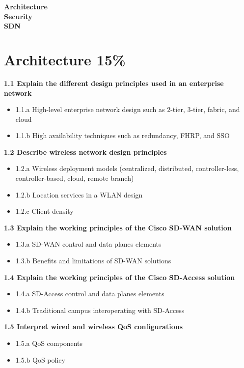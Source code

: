 \documentclass{article}
\begin{document}
\newpage
\noindent\textbf{Architecture}\\

\newpage
\noindent\textbf{Security}\\

\newpage
\noindent\textbf{SDN}\\

\newpage
\section{Architecture 15\%}
\textbf{1.1 Explain the different design principles used in an enterprise network}
\begin{itemize}
\item 1.1.a High-level enterprise network design such as 2-tier, 3-tier, fabric, and cloud
\item 1.1.b High availability techniques such as redundancy, FHRP, and SSO
\end{itemize}

\noindent\textbf{1.2 Describe wireless network design principles}
\begin{itemize}
\item 1.2.a Wireless deployment models (centralized, distributed, controller-less, controller-based, cloud, remote branch)
\item 1.2.b Location services in a WLAN design
\item 1.2.c Client density
\end{itemize}

\noindent\textbf{1.3 Explain the working principles of the Cisco SD-WAN solution}
\begin{itemize}
\item 1.3.a SD-WAN control and data planes elements
\item 1.3.b Benefits and limitations of SD-WAN solutions
\end{itemize}

\noindent\textbf{1.4 Explain the working principles of the Cisco SD-Access solution}
\begin{itemize}
\item 1.4.a SD-Access control and data planes elements
\item 1.4.b Traditional campus interoperating with SD-Access
\end{itemize}

\noindent\textbf{1.5 Interpret wired and wireless QoS configurations}
\begin{itemize}
\item 1.5.a QoS components
\item 1.5.b QoS policy
\end{itemize}
\end{document}
